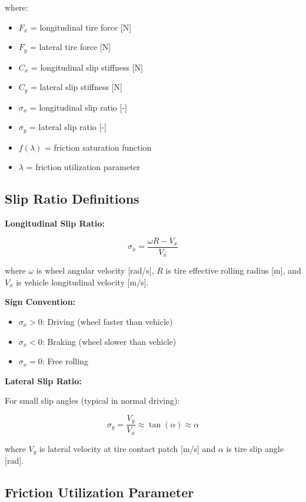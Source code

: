 \documentclass[11pt,a4paper]{article}
\begin{document}
where:
\begin{itemize}
    \item $F_x$ = longitudinal tire force [N]
    \item $F_y$ = lateral tire force [N]
    \item $C_x$ = longitudinal slip stiffness [N]
    \item $C_y$ = lateral slip stiffness [N]
    \item $\sigma_x$ = longitudinal slip ratio [-]
    \item $\sigma_y$ = lateral slip ratio [-]
    \item $f(\lambda)$ = friction saturation function
    \item $\lambda$ = friction utilization parameter
\end{itemize}

\subsection{Slip Ratio Definitions}

\textbf{Longitudinal Slip Ratio:}

\begin{equation}
\sigma_x = \frac{\omega R - V_x}{V_x}
\end{equation}

where $\omega$ is wheel angular velocity [rad/s], $R$ is tire effective rolling radius [m], and $V_x$ is vehicle longitudinal velocity [m/s].

\textbf{Sign Convention:}
\begin{itemize}
    \item $\sigma_x > 0$: Driving (wheel faster than vehicle)
    \item $\sigma_x < 0$: Braking (wheel slower than vehicle)
    \item $\sigma_x = 0$: Free rolling
\end{itemize}

\textbf{Lateral Slip Ratio:}

For small slip angles (typical in normal driving):

\begin{equation}
\sigma_y = \frac{V_y}{V_x} \approx \tan(\alpha) \approx \alpha
\end{equation}

where $V_y$ is lateral velocity at tire contact patch [m/s] and $\alpha$ is tire slip angle [rad].

\subsection{Friction Utilization Parameter}
\end{document}
